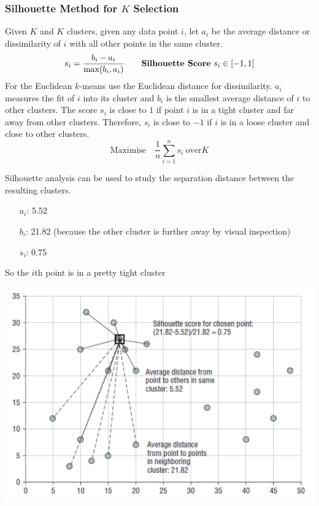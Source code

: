 \documentclass[11pt]{article}
\theoremstyle{definition}
\begin{document}
\subsubsection{Silhouette Method for $K$ Selection}
Given $K$ and $K$ clusters, given any data point $i$, let $a_i$ be the average distance or dissimilarity of $i$ with all other points in the same cluster.
\begin{equation*}
	s_i = \frac{b_i - a_i}{\max(b_i,a_i)} \tag*{\textbf{Silhouette Score} $s_i \in [-1,1]$}
 \end{equation*}
For the Euclidean $k$-means use the Euclidean distance for dissimilarity. $a_i$ measures the fit of $i$ into its cluster and $b_i$ is the smallest average distance of $i$ to other clusters. The score $s_i$ is close to $1$ if point $i$ is in a tight cluster and far away from other clusters. Therefore, $s_i$ is close to $-1$ if $i$ is in a loose cluster and close to other clusters.
\begin{equation*}
	\text{Maximise}\quad \frac{1}{n}\sum_{i=1}^{n}s_i\ \text{over} K
\end{equation*}

\noindent
\begin{minipage}{0.4\linewidth}
	Silhouette analysis can be used to study the separation distance between the resulting clusters.
	\begin{itemize}
		\item[$a_i$:] 5.52
		\item[$b_i$:] 21.82 (because the other cluster is further away by visual inspection)
		\item[$s_i$:] 0.75
	\end{itemize}
	So the $i$th point is in a pretty tight cluster
\end{minipage}
\hfill
\begin{minipage}{0.57\linewidth}
	\includegraphics[width=\linewidth]{img/silhouette_score_example}
\end{minipage}
\end{document}
